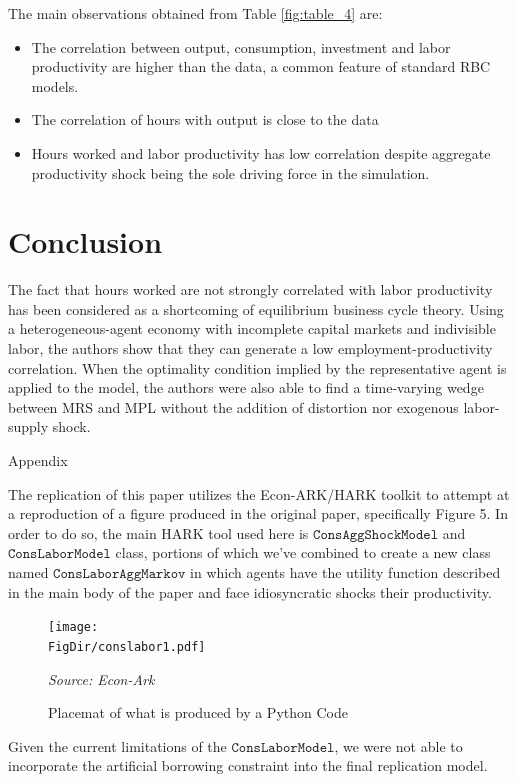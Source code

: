 \documentclass[titlepage,letterpaper]{\econtex}
\begin{document}
The main observations obtained from Table \ref{fig:table_4}  are:
\begin{itemize}
\item The correlation between output, consumption, investment and labor productivity are higher than the data, a common feature of standard RBC models.
\item The correlation of hours with output is close to the data
\item Hours worked and labor productivity has low correlation despite aggregate productivity shock being the sole driving force in the simulation.
  \end{itemize} 

\hypertarget{LCandCCIntro}{}

\section{Conclusion}

The fact that hours worked are not strongly correlated with labor productivity has been considered as a shortcoming of equilibrium business cycle theory. Using a heterogeneous-agent economy with incomplete capital markets and indivisible labor, the authors show that they can generate a low employment-productivity correlation. When the optimality condition implied by the representative agent is applied to the model, the authors were also able to find a time-varying wedge between MRS and MPL without the addition of distortion nor exogenous labor-supply shock.

\vfill\eject
\appendix

\centerline{\LARGE Appendix}
\medskip

\hfill

The replication of this paper utilizes the Econ-ARK/HARK toolkit to attempt at a reproduction of a figure produced in the original paper, specifically Figure 5. In order to do so, the main HARK tool used here is $\texttt{ConsAggShockModel}$ and $\texttt{ConsLaborModel}$ class, portions of which we've combined to create a new class named $\texttt{ConsLaborAggMarkov}$ in which agents have the utility function described in the main body of the paper and face idiosyncratic shocks their productivity.

  \begin{figure}[ht]
    {\centering \texttt{[image: \\FigDir/conslabor1.pdf]}}
    \caption{Placemat of what is produced by a Python Code}
    \footnotesize {\emph{Source: Econ-Ark}}
    \label{fig:codeproduced}
  \end{figure}

Given the current limitations of the $\texttt{ConsLaborModel}$, we were not able to incorporate the artificial borrowing constraint into the final replication model. 

\clearpage\pagebreak\vfill\eject


\end{document}
